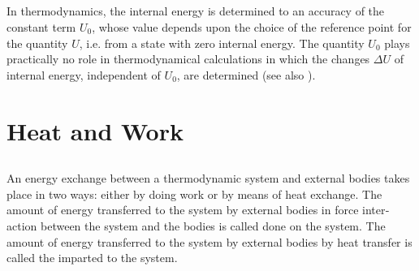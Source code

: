 \subsection{}\label{9.1.5} In thermodynamics, the internal energy is determined to an accuracy of the constant term $U_{0}$, whose value depends upon the choice of the reference point for the quantity $U$, i.e. from a state with zero internal energy. The quantity $U_{0}$ plays practically no role in thermodynamical calculations in which the changes $\Delta U$ of internal energy, independent of $U_{0}$, are determined (see also ).

\section{Heat and Work}
\label{sec-9.2}

\subsection{}\label{9.2.1} An energy exchange between a thermodynamic system and external bodies takes place in two ways: either by doing work or by means of heat exchange. The amount of energy transferred to the system by external bodies in force inter­ action between the system and the bodies is called  done on the system. The amount of energy transferred to the system by external bodies by heat transfer is called the  imparted to the system.

